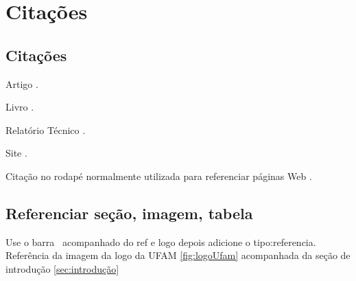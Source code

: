 
\chapter{Citações}

	\section{Citações}
	    
		Artigo \cite{higginbottom1998performance}.
		
        Livro \cite{kurose2013computer}.
        
        Relatório Técnico \cite{Scott2007}.
        
        Site \cite{Raspberry}.
	
	Citação no rodapé normalmente utilizada para referenciar páginas Web .
		
	\section{Referenciar seção, imagem, tabela}
	    Use o barra \ acompanhado do ref e logo depois adicione o tipo:referencia. Referência da imagem da logo da UFAM \ref{fig:logoUfam} acompanhada da seção de introdução \ref{sec:introdução}
		
